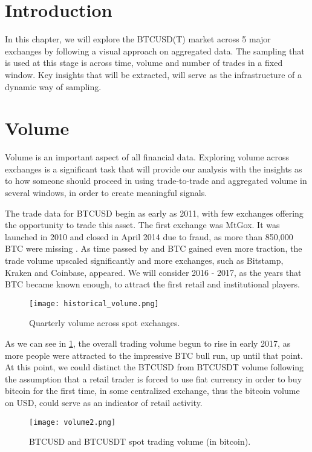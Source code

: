 
\section{Introduction}

In this chapter, we will explore the BTCUSD(T) market across 5 major exchanges by following a visual approach on aggregated data. The sampling that is used at this stage is across time, volume and number of trades in a fixed window. Key insights that will be extracted, will serve as the infrastructure of a dynamic way of sampling. 


\section{Volume}

Volume is an important aspect of all financial data. Exploring volume across exchanges is a significant task that will provide our analysis with the insights as to how someone should proceed in using trade-to-trade and aggregated volume in several windows, in order to create meaningful signals.

The trade data for BTCUSD begin as early as 2011, with few exchanges offering the opportunity to trade this asset. The first exchange was MtGox. It was launched in 2010 and closed in April 2014 due to fraud, as more than 850,000 BTC were missing \cite{wiki_mt}. As time passed by and BTC gained even more traction, the trade volume upscaled significantly and more exchanges, such as Bitstamp, Kraken and Coinbase, appeared. We will consider 2016 - 2017, as the years that BTC became known enough, to attract the first retail and institutional players.

\begin{figure}[h]
    \centering
    \texttt{[image: historical\_volume.png]}
    \caption{Quarterly volume across spot exchanges.}
    \label{fig:hist_vol}
\end{figure}


As we can see in \ref{fig:hist_vol}, the overall trading volume begun to rise in early 2017, as more people were attracted to the impressive BTC bull run, up until that point. At this point, we could distinct the BTCUSD from BTCUSDT volume following the assumption that a retail trader is forced to use fiat currency in order to buy bitcoin for the first time, in some centralized exchange, thus the bitcoin volume on USD, could serve as an indicator of retail activity.


\begin{figure}[h]
    \centering
    \texttt{[image: volume2.png]}
    \caption{BTCUSD and BTCUSDT spot trading volume (in bitcoin).}
    \label{fig:vol2}
\end{figure}

